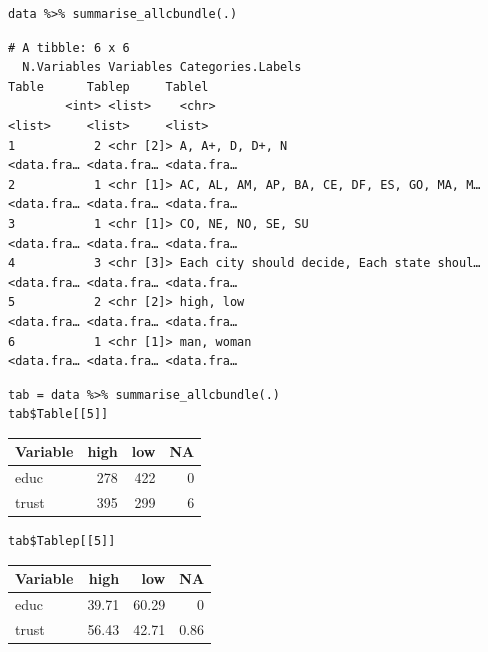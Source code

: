 \documentclass[a4paper]{article}
\begin{document}
\lstset{numbers=left,language=r,label=orgdc3968e,caption= ,captionpos=b}
\begin{lstlisting}
data %>% summarise_allcbundle(.) 
\end{lstlisting}

\begin{verbatim}
# A tibble: 6 x 6
  N.Variables Variables Categories.Labels                          Table      Tablep     Tablel    
        <int> <list>    <chr>                                      <list>     <list>     <list>    
1           2 <chr [2]> A, A+, D, D+, N                            <data.fra… <data.fra… <data.fra…
2           1 <chr [1]> AC, AL, AM, AP, BA, CE, DF, ES, GO, MA, M… <data.fra… <data.fra… <data.fra…
3           1 <chr [1]> CO, NE, NO, SE, SU                         <data.fra… <data.fra… <data.fra…
4           3 <chr [3]> Each city should decide, Each state shoul… <data.fra… <data.fra… <data.fra…
5           2 <chr [2]> high, low                                  <data.fra… <data.fra… <data.fra…
6           1 <chr [1]> man, woman                                 <data.fra… <data.fra… <data.fra…
\end{verbatim}







\lstset{numbers=left,language=r,label=org96a34ea,caption= ,captionpos=b}
\begin{lstlisting}
tab = data %>% summarise_allcbundle(.)
tab$Table[[5]]
\end{lstlisting}

\begin{center}
\begin{tabular}{lrrr}
Variable & high & low & NA\\
\hline
educ & 278 & 422 & 0\\
trust & 395 & 299 & 6\\
\end{tabular}
\end{center}



\lstset{numbers=left,language=r,label=org2cff389,caption= ,captionpos=b}
\begin{lstlisting}
tab$Tablep[[5]]
\end{lstlisting}

\begin{center}
\begin{tabular}{lrrr}
Variable & high & low & NA\\
\hline
educ & 39.71 & 60.29 & 0\\
trust & 56.43 & 42.71 & 0.86\\
\end{tabular}
\end{center}
\end{document}
